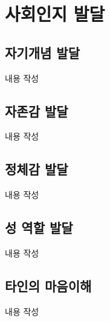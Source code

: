 \section{사회인지 발달}

\subsection{자기개념 발달}
내용 작성

\subsection{자존감 발달}
내용 작성

\subsection{정체감 발달}
내용 작성

\subsection{성 역할 발달}
내용 작성

\subsection{타인의 마음이해}
내용 작성

